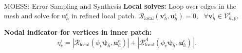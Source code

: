 \documentclass{beamer}
\newcounter{sectionframecount}
\begin{document}
\begin{frame}[t]{MOESS: Error Sampling and Synthesis}
\vspace{-12pt}
\textbf{Local solves:} Loop over edges in the mesh and solve for $\boldsymbol{u}_h^\epsilon$ in refined local patch.
$\mathcal{R}_{\text{local}}(\boldsymbol{v}_h^\epsilon,\boldsymbol{u}_h^\epsilon) = 0,~~~\forall \boldsymbol{v}_h^\epsilon \in \mathcal{V}_{h,p}^\epsilon$.


\vspace{4.3cm}
\textbf{Nodal indicator for vertices in inner patch:}
\begin{equation}
  \eta_v^\epsilon = |\mathcal{R}_\text{local}(\phi_v \boldsymbol{\psi}_{\hat{h}},\boldsymbol{u}_h^\epsilon)| + |\mathcal{R}_\text{local}^A(\phi_v\boldsymbol{\psi}_{\hat{h}},\boldsymbol{u}^\epsilon_h)|.
  \label{e:dwr_ind_base_local}
\end{equation}

\end{frame}

\end{document}
